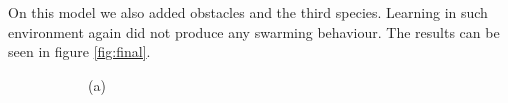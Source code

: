 \documentclass[9pt]{pnas-new}
\begin{document}
	On this model we also added obstacles and the third species. Learning in such environment again did not produce any swarming behaviour. 
	The results can be seen in figure \ref{fig:final}.
	
	\begin{figure}[ht]
		\centering
		\begin{subfigure}{0.22\textwidth}
			\centering
			\vspace{0.5em}
			\centering (a)
		\end{subfigure}
		\hfill
		\begin{subfigure}{0.22\textwidth}
			\centering

\end{subfigure}
\end{figure}
\end{document}
